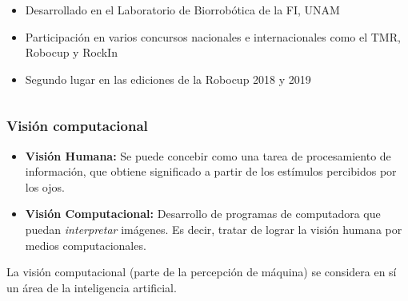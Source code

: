 \documentclass[10pt,spanish,aspectratio=1610]{beamer}
\begin{document}
\begin{frame}
\begin{columns}
\begin{column}{0.6\textwidth}
      \begin{itemize}
      \item Desarrollado en el Laboratorio de Biorrobótica de la FI, UNAM
      \item Participación en varios concursos nacionales e internacionales como el TMR, Robocup y RockIn
        \item Segundo lugar en las ediciones de la Robocup 2018 y 2019 
      \end{itemize}
    \end{column}
  \end{columns}
\end{frame}

\begin{frame}\frametitle{Visión computacional}
  \begin{itemize}
  \item \textbf{Visión Humana: } Se puede concebir como una tarea de procesamiento de información, que obtiene significado a partir de los estímulos percibidos por los ojos.
  \item \textbf{Visión Computacional: } Desarrollo de programas de computadora que puedan \textit{interpretar} imágenes. Es decir, tratar de lograr la visión humana por medios computacionales.
  \end{itemize}
  La visión computacional (parte de la percepción de máquina) se considera en sí un área de la inteligencia artificial.
\end{frame}
\end{document}
